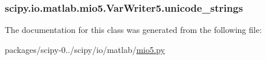 \subsubsection[{unicode\+\_\+strings}]{\setlength{\rightskip}{0pt plus 5cm}scipy.\+io.\+matlab.\+mio5.\+Var\+Writer5.\+unicode\+\_\+strings}\label{classscipy_1_1io_1_1matlab_1_1mio5_1_1VarWriter5_a422aeeb6eabad96e8a9ccb56bd381eaa}


The documentation for this class was generated from the following file\+:\begin{DoxyCompactItemize}
\item 
packages/scipy-\/0../scipy/io/matlab/\hyperlink{mio5_8py}{mio5.\+py}\end{DoxyCompactItemize}
